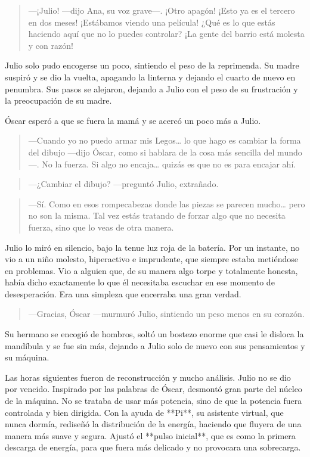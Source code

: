 \documentclass[a4paper,12pt]{book}
\begin{document}
\begin{quote}
    —¡Julio! —dijo Ana, su voz grave—. ¡Otro apagón! ¡Esto ya es el tercero en dos meses! ¡Estábamos viendo una película! ¿Qué es lo que estás haciendo aquí que no lo puedes controlar? ¡La gente del barrio está molesta y con razón!
\end{quote}

Julio solo pudo encogerse un poco, sintiendo el peso de la reprimenda. Su madre suspiró y se dio la vuelta, apagando la linterna y dejando el cuarto de nuevo en penumbra. Sus pasos se alejaron, dejando a Julio con el peso de su frustración y la preocupación de su madre.

Óscar esperó a que se fuera la mamá y se acercó un poco más a Julio.

\begin{quote}
    —Cuando yo no puedo armar mis Legos… lo que hago es cambiar la forma del dibujo —dijo Óscar, como si hablara de la cosa más sencilla del mundo—. No la fuerza. Si algo no encaja… quizás es que no es para encajar ahí.
\end{quote}

\begin{quote}
    —¿Cambiar el dibujo? —preguntó Julio, extrañado.
\end{quote}

\begin{quote}
    —Sí. Como en esos rompecabezas donde las piezas se parecen mucho… pero no son la misma. Tal vez estás tratando de forzar algo que no necesita fuerza, sino que lo veas de otra manera.
\end{quote}

Julio lo miró en silencio, bajo la tenue luz roja de la batería. Por un instante, no vio a un niño molesto, hiperactivo e imprudente, que siempre estaba metiéndose en problemas. Vio a alguien que, de su manera algo torpe y totalmente honesta, había dicho exactamente lo que él necesitaba escuchar en ese momento de desesperación. Era una simpleza que encerraba una gran verdad.

\begin{quote}
    —Gracias, Óscar —murmuró Julio, sintiendo un peso menos en su corazón.
\end{quote}

Su hermano se encogió de hombros, soltó un bostezo enorme que casi le disloca la mandíbula y se fue sin más, dejando a Julio solo de nuevo con sus pensamientos y su máquina.

Las horas siguientes fueron de reconstrucción y mucho análisis. Julio no se dio por vencido. Inspirado por las palabras de Óscar, desmontó gran parte del núcleo de la máquina. No se trataba de usar más potencia, sino de que la potencia fuera controlada y bien dirigida. Con la ayuda de **Pi**, su asistente virtual, que nunca dormía, rediseñó la distribución de la energía, haciendo que fluyera de una manera más suave y segura. Ajustó el **pulso inicial**, que es como la primera descarga de energía, para que fuera más delicado y no provocara una sobrecarga.
\end{document}
